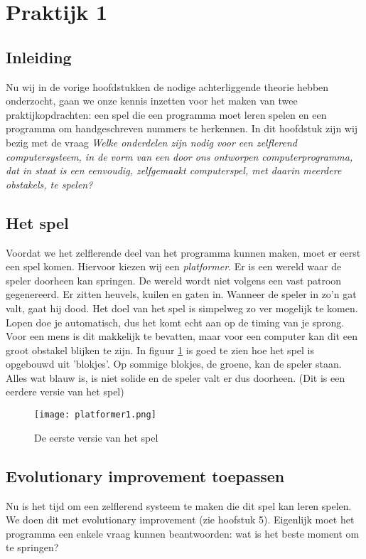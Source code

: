 \section{Praktijk 1}


\subsection{Inleiding}
Nu wij in de vorige hoofdstukken de nodige achterliggende theorie hebben onderzocht, gaan we onze kennis inzetten voor het maken van twee praktijkopdrachten: een spel die een programma moet leren spelen en een programma om handgeschreven nummers te herkennen. In dit hoofdstuk zijn wij bezig met de vraag \textit{Welke onderdelen zijn nodig voor een zelflerend computersysteem, in de vorm van een door ons ontworpen computerprogramma, dat in staat is een eenvoudig, zelfgemaakt computerspel, met daarin meerdere obstakels, te spelen?}

\subsection{Het spel}
Voordat we het zelflerende deel van het programma kunnen maken, moet er eerst een spel komen. Hiervoor kiezen wij een \textit{platformer}. Er is een wereld waar de speler doorheen kan springen. De wereld wordt niet volgens een vast patroon gegenereerd. Er zitten heuvels, kuilen en gaten in. Wanneer de speler in zo'n gat valt, gaat hij dood. Het doel van het spel is simpelweg zo ver mogelijk te komen. Lopen doe je automatisch, dus het komt echt aan op de timing van je sprong. Voor een mens is dit makkelijk te bevatten, maar voor een computer kan dit een groot obstakel blijken te zijn.
In figuur \ref{fig:platformer1} is goed te zien hoe het spel is opgebouwd uit 'blokjes'. Op sommige blokjes, de groene, kan de speler staan. Alles wat blauw is, is niet solide en de speler valt er dus doorheen. (Dit is een eerdere versie van het spel)

\begin{figure}[h]
  \centering
    \texttt{[image: platformer1.png]}
  \caption{De eerste versie van het spel}
  \label{fig:platformer1}
\end{figure}

\subsection{Evolutionary improvement toepassen}
Nu is het tijd om een zelflerend systeem te maken die dit spel kan leren spelen. We doen dit met evolutionary improvement (zie hoofstuk 5). Eigenlijk moet het programma een enkele vraag kunnen beantwoorden: wat is het beste moment om te springen?

